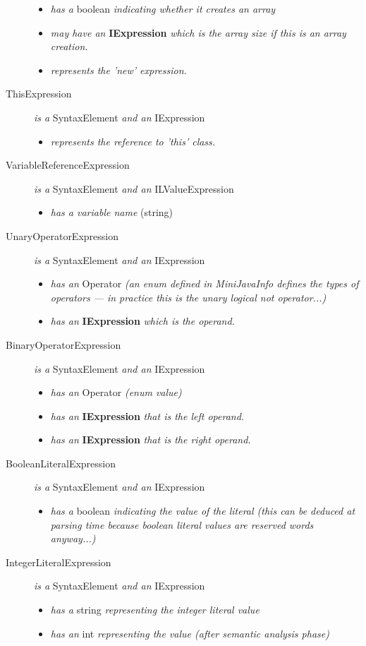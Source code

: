 \documentclass[a4paper,11pt]{article}
\begin{document}
\begin{description}
\begin{itemize}
        \item \emph{has a} boolean \emph{indicating whether it creates an array}
        \item \emph{may have an} \textbf{IExpression} \emph{which is the array size if this is an array creation.}
        \item \emph{represents the 'new' expression.}
      \end{itemize}
    \item[ThisExpression] \emph{is a} SyntaxElement \emph{and an} IExpression
      \begin{itemize}
        \item \emph{represents the reference to 'this' class.}
      \end{itemize}
    \item[VariableReferenceExpression] \emph{is a} SyntaxElement \emph{and an} ILValueExpression
      \begin{itemize}
        \item \emph{has a variable name} (string)
      \end{itemize}
    \item[UnaryOperatorExpression] \emph{is a} SyntaxElement \emph{and an} IExpression
      \begin{itemize}
        \item \emph{has an} Operator \emph{(an enum defined in MiniJavaInfo defines the types of operators --- in practice this is the unary logical not operator...)}
        \item \emph{has an} \textbf{IExpression} \emph{which is the operand.}
      \end{itemize}
    \item[BinaryOperatorExpression] \emph{is a} SyntaxElement \emph{and an} IExpression
      \begin{itemize}
        \item \emph{has an} Operator \emph{(enum value)}
        \item \emph{has an} \textbf{IExpression} \emph{that is the left operand.}
        \item \emph{has an} \textbf{IExpression} \emph{that is the right operand.}
      \end{itemize}
    \item[BooleanLiteralExpression] \emph{is a} SyntaxElement \emph{and an} IExpression
      \begin{itemize}
        \item \emph{has a} boolean \emph{indicating the value of the literal (this can be deduced at parsing time because boolean literal values are reserved words anyway...)}
      \end{itemize}
    \item[IntegerLiteralExpression] \emph{is a} SyntaxElement \emph{and an} IExpression
      \begin{itemize}
        \item \emph{has a} string \emph{representing the integer literal value}
        \item \emph{has an} int \emph{representing the value (after semantic analysis phase)}
      \end{itemize}
\end{description}
\end{document}
